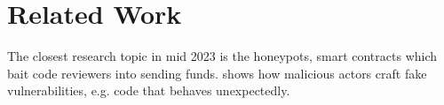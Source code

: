 \section{Related Work} \label{sec:related-work}

The closest research topic in mid 2023 is the honeypots, smart contracts which bait code reviewers into sending funds.
\cite{the-art-of-the-scam} shows how malicious actors craft fake vulnerabilities, e.g. code that behaves unexpectedly.
